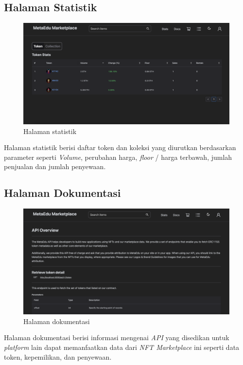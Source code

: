\subsection{Halaman Statistik}
\begin{figure} [H] \centering
  \includegraphics[scale=0.3]{gambar/img-frontend-stats.png}
  \caption{Halaman statistik}
  \label{fig:TokenStats}
\end{figure}

Halaman statistik berisi daftar token dan koleksi yang diurutkan berdasarkan parameter seperti \emph{Volume}, perubahan harga, \emph{floor} / harga terbawah, jumlah penjualan dan jumlah penyewaan.

\subsection{Halaman Dokumentasi}
\begin{figure} [H] \centering
  \includegraphics[scale=0.3]{gambar/img-frontend-api.png}
  \caption{Halaman dokumentasi}
  \label{fig:Docs}
\end{figure}

Halaman dokumentasi berisi informasi mengenai \emph{API} yang disedikan untuk \emph{platform} lain dapat memanfaatkan data dari \emph{NFT Marketplace} ini seperti data token, kepemilikan, dan penyewaan.

